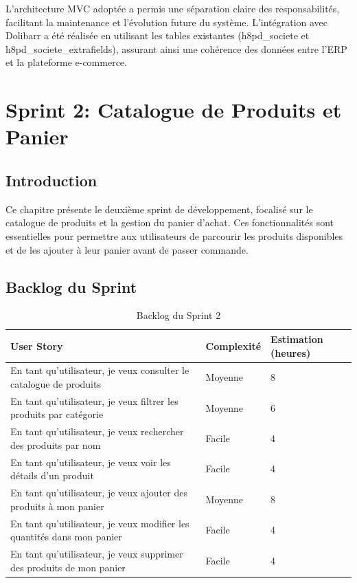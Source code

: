 \documentclass[12pt,a4paper]{report}
\begin{document}
L'architecture MVC adoptée a permis une séparation claire des responsabilités, facilitant la maintenance et l'évolution future du système. L'intégration avec Dolibarr a été réalisée en utilisant les tables existantes (h8pd\_societe et h8pd\_societe\_extrafields), assurant ainsi une cohérence des données entre l'ERP et la plateforme e-commerce.

\chapter{Sprint 2: Catalogue de Produits et Panier}
\section{Introduction}
Ce chapitre présente le deuxième sprint de développement, focalisé sur le catalogue de produits et la gestion du panier d'achat. Ces fonctionnalités sont essentielles pour permettre aux utilisateurs de parcourir les produits disponibles et de les ajouter à leur panier avant de passer commande.

\section{Backlog du Sprint}

\begin{table}[H]
\centering
\begin{tabularx}{\textwidth}{|X|X|X|}
\hline
\textbf{User Story} & \textbf{Complexité} & \textbf{Estimation (heures)} \\
\hline
En tant qu'utilisateur, je veux consulter le catalogue de produits & Moyenne & 8 \\
\hline
En tant qu'utilisateur, je veux filtrer les produits par catégorie & Moyenne & 6 \\
\hline
En tant qu'utilisateur, je veux rechercher des produits par nom & Facile & 4 \\
\hline
En tant qu'utilisateur, je veux voir les détails d'un produit & Facile & 4 \\
\hline
En tant qu'utilisateur, je veux ajouter des produits à mon panier & Moyenne & 8 \\
\hline
En tant qu'utilisateur, je veux modifier les quantités dans mon panier & Facile & 4 \\
\hline
En tant qu'utilisateur, je veux supprimer des produits de mon panier & Facile & 4 \\
\hline
\end{tabularx}
\caption{Backlog du Sprint 2}
\label{tab:backlog_sprint2}
\end{table}
\end{document}
